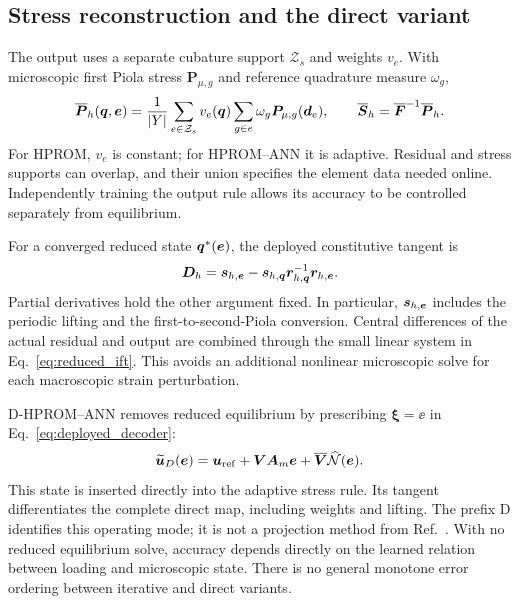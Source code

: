 \subsection{Stress reconstruction and the direct variant}
The output uses a separate cubature support $\mathcal Z_s$ and weights $v_e$. With microscopic first Piola stress $\bm P_{\mu,g}$ and reference quadrature measure $\omega_g$,
\begin{equation}
 \overline{\bm P}_h(\bm q,\bm e)=
 \frac1{|Y|}\sum_{e\in\mathcal Z_s}v_e(\bm q)
        \sum_{g\in e}\omega_g\bm P_{\mu,g}(\bm d_e),\qquad
 \overline{\bm S}_h=\overline{\bm F}^{-1}\overline{\bm P}_h .
 \label{eq:hyperreduced_stress}
\end{equation}
For HPROM, $v_e$ is constant; for HPROM--ANN it is adaptive. Residual and stress supports can overlap, and their union specifies the element data needed online. Independently training the output rule allows its accuracy to be controlled separately from equilibrium.

For a converged reduced state $\bm q^*(\bm e)$, the deployed constitutive tangent is
\begin{equation}
 \bm D_h=\bm s_{h,\bm e}
       -\bm s_{h,\bm q}\bm r_{h,\bm q}^{-1}\bm r_{h,\bm e}.
 \label{eq:reduced_ift}
\end{equation}
Partial derivatives hold the other argument fixed. In particular, $\bm s_{h,\bm e}$ includes the periodic lifting and the first-to-second-Piola conversion. Central differences of the actual residual and output are combined through the small linear system in Eq.~\eqref{eq:reduced_ift}. This avoids an additional nonlinear microscopic solve for each macroscopic strain perturbation.

D-HPROM--ANN removes reduced equilibrium by prescribing $\bm\xi=\ee$ in Eq.~\eqref{eq:deployed_decoder}:
\begin{equation}
 \widetilde{\bm u}_{D}(\bm e)=\bm u_{\rm ref}
       +\bm V\bm A_m\bm e
       +\overline{\bm V}\widehat{\mathcal N}(\bm e).
 \label{eq:direct_decoder}
\end{equation}
This state is inserted directly into the adaptive stress rule. Its tangent differentiates the complete direct map, including weights and lifting. The prefix D identifies this operating mode; it is not a projection method from Ref.~\cite{aresdeparga2026nonlinear}. With no reduced equilibrium solve, accuracy depends directly on the learned relation between loading and microscopic state. There is no general monotone error ordering between iterative and direct variants.

